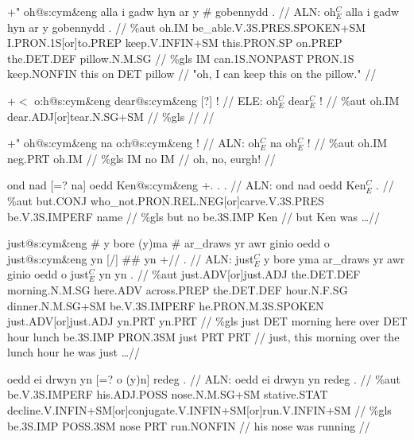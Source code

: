 \documentclass[a4paper,10pt]{article}
\begin{document}
\ex
\begingl[lingstyle=gergl]
\glchat +" oh@s:cym\&eng alla i gadw hyn ar y \# gobennydd . //
\glsurface ALN:  oh$^{C}_{E}$ alla i gadw hyn ar y gobennydd .  //
\glauto \%aut  oh{\scriptsize .IM} be\_able{\scriptsize .V.3S.PRES.SPOKEN+SM} I{\scriptsize .PRON.1S[or]to.PREP} keep{\scriptsize .V.INFIN+SM} this{\scriptsize .PRON.SP} on{\scriptsize .PREP} the{\scriptsize .DET.DEF} pillow{\scriptsize .N.M.SG}   //
\glmanual \%gls  IM can{\scriptsize .1S.NONPAST} PRON{\scriptsize .1S} keep{\scriptsize .NONFIN} this on DET pillow   //
\gleng "oh, I can keep this on the pillow." //
\endgl
\xe

\ex
\begingl[lingstyle=gergl]
\glchat +$<$ o:h@s:cym\&eng dear@s:cym\&eng [?] ! //
\glsurface ELE:  oh$^{C}_{E}$ dear$^{C}_{E}$ !  //
\glauto \%aut  oh{\scriptsize .IM} dear{\scriptsize .ADJ[or]tear.N.SG+SM}   //
\glmanual \%gls      //
\gleng  //
\endgl
\xe

\ex
\begingl[lingstyle=gergl]
\glchat +" oh@s:cym\&eng na o:h@s:cym\&eng ! //
\glsurface ALN:  oh$^{C}_{E}$ na oh$^{C}_{E}$ !  //
\glauto \%aut  oh{\scriptsize .IM} neg{\scriptsize .PRT} oh{\scriptsize .IM}   //
\glmanual \%gls  IM no IM   //
\gleng oh, no, eurgh! //
\endgl
\xe

\ex
\begingl[lingstyle=gergl]
\glchat ond nad [=? na] oedd Ken@s:cym\&eng +. . . //
\glsurface ALN:  ond nad oedd Ken$^{C}_{E}$ .  //
\glauto \%aut  but{\scriptsize .CONJ} who\_not{\scriptsize .PRON.REL.NEG[or]carve.V.3S.PRES} be{\scriptsize .V.3S.IMPERF} name   //
\glmanual \%gls  but no be{\scriptsize .3S.IMP} Ken   //
\gleng but Ken was \dots  //
\endgl
\xe

\ex
\begingl[lingstyle=gergl]
\glchat just@s:cym\&eng \# y bore (y)ma \# ar\_draws yr awr ginio oedd o just@s:cym\&eng yn [/] \#\# yn +// . //
\glsurface ALN:  just$^{C}_{E}$ y bore yma ar\_draws yr awr ginio oedd o just$^{C}_{E}$ yn yn .  //
\glauto \%aut  just{\scriptsize .ADV[or]just.ADJ} the{\scriptsize .DET.DEF} morning{\scriptsize .N.M.SG} here{\scriptsize .ADV} across{\scriptsize .PREP} the{\scriptsize .DET.DEF} hour{\scriptsize .N.F.SG} dinner{\scriptsize .N.M.SG+SM} be{\scriptsize .V.3S.IMPERF} he{\scriptsize .PRON.M.3S.SPOKEN} just{\scriptsize .ADV[or]just.ADJ} yn{\scriptsize .PRT} yn{\scriptsize .PRT}   //
\glmanual \%gls  just DET morning here over DET hour lunch be{\scriptsize .3S.IMP} PRON{\scriptsize .3SM} just PRT PRT   //
\gleng just, this morning over the lunch hour he was just \dots  //
\endgl
\xe

\ex
\begingl[lingstyle=gergl]
\glchat oedd ei drwyn yn [=? o (y)n] redeg . //
\glsurface ALN:  oedd ei drwyn yn redeg .  //
\glauto \%aut  be{\scriptsize .V.3S.IMPERF} his{\scriptsize .ADJ.POSS} nose{\scriptsize .N.M.SG+SM} stative{\scriptsize .STAT} decline{\scriptsize .V.INFIN+SM[or]conjugate.V.INFIN+SM[or]run.V.INFIN+SM}   //
\glmanual \%gls  be{\scriptsize .3S.IMP} POSS{\scriptsize .3SM} nose PRT run{\scriptsize .NONFIN}   //
\gleng his nose was running //
\endgl
\xe
\end{document}
